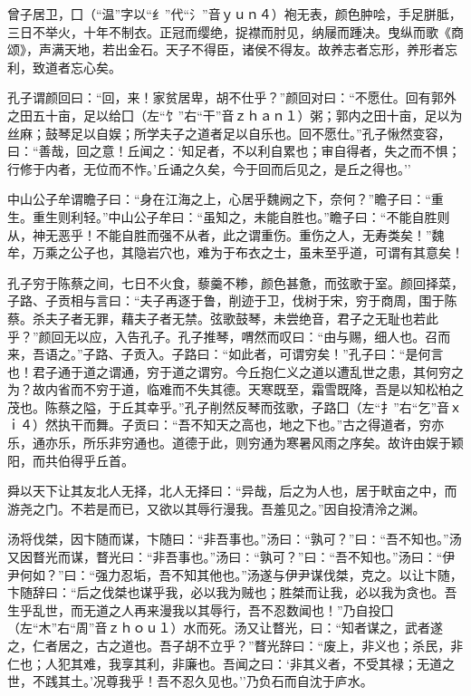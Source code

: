 \documentclass[]{article}
\begin{document}
曾子居卫，囗（``温''字以``纟''代``氵''音ｙｕｎ４）袍无表，颜色肿哙，手足胼胝，三日不举火，十年不制衣。正冠而缨绝，捉襟而肘见，纳屦而踵决。曳纵而歌《商颂》，声满天地，若出金石。天子不得臣，诸侯不得友。故养志者忘形，养形者忘利，致道者忘心矣。

孔子谓颜回曰：``回，来！家贫居卑，胡不仕乎？''颜回对曰：``不愿仕。回有郭外之田五十亩，足以给囗（左``饣''右``干''音ｚｈａｎ１）粥；郭内之田十亩，足以为丝麻；鼓琴足以自娱；所学夫子之道者足以自乐也。回不愿仕。''孔子愀然变容，曰：``善哉，回之意！丘闻之：`知足者，不以利自累也；审自得者，失之而不惧；行修于内者，无位而不怍。'丘诵之久矣，今于回而后见之，是丘之得也。''

中山公子牟谓瞻子曰：``身在江海之上，心居乎魏阙之下，奈何？''瞻子曰：``重生。重生则利轻。''中山公子牟曰：``虽知之，未能自胜也。''瞻子曰：``不能自胜则从，神无恶乎！不能自胜而强不从者，此之谓重伤。重伤之人，无寿类矣！''魏牟，万乘之公子也，其隐岩穴也，难为于布衣之士，虽未至乎道，可谓有其意矣！

孔子穷于陈蔡之间，七日不火食，藜羹不糁，颜色甚惫，而弦歌于室。颜回择菜，子路、子贡相与言曰：``夫子再逐于鲁，削迹于卫，伐树于宋，穷于商周，围于陈蔡。杀夫子者无罪，藉夫子者无禁。弦歌鼓琴，未尝绝音，君子之无耻也若此乎？''颜回无以应，入告孔子。孔子推琴，喟然而叹曰：``由与赐，细人也。召而来，吾语之。''子路、子贡入。子路曰：``如此者，可谓穷矣！''孔子曰：``是何言也！君子通于道之谓通，穷于道之谓穷。今丘抱仁义之道以遭乱世之患，其何穷之为？故内省而不穷于道，临难而不失其德。天寒既至，霜雪既降，吾是以知松柏之茂也。陈蔡之隘，于丘其幸乎。''孔子削然反琴而弦歌，子路囗（左``扌''右``乞''音ｘｉ４）然执干而舞。子贡曰：``吾不知天之高也，地之下也。''古之得道者，穷亦乐，通亦乐，所乐非穷通也。道德于此，则穷通为寒暑风雨之序矣。故许由娱于颖阳，而共伯得乎丘首。

舜以天下让其友北人无择，北人无择曰：``异哉，后之为人也，居于畎亩之中，而游尧之门。不若是而已，又欲以其辱行漫我。吾羞见之。''因自投清泠之渊。

汤将伐桀，因卞随而谋，卞随曰：``非吾事也。''汤曰：``孰可？''曰∶``吾不知也。''汤又因瞀光而谋，瞀光曰：``非吾事也。''汤曰∶``孰可？''曰：``吾不知也。''汤曰：``伊尹何如？''曰：``强力忍垢，吾不知其他也。''汤遂与伊尹谋伐桀，克之。以让卞随，卞随辞曰：``后之伐桀也谋乎我，必以我为贼也；胜桀而让我，必以我为贪也。吾生乎乱世，而无道之人再来漫我以其辱行，吾不忍数闻也！''乃自投囗（左``木''右``周''音ｚｈｏｕ１）水而死。汤又让瞀光，曰：``知者谋之，武者遂之，仁者居之，古之道也。吾子胡不立乎？''瞀光辞曰：``废上，非义也；杀民，非仁也；人犯其难，我享其利，非廉也。吾闻之曰：`非其义者，不受其禄；无道之世，不践其土。'况尊我乎！吾不忍久见也。''乃负石而自沈于庐水。
\end{document}
